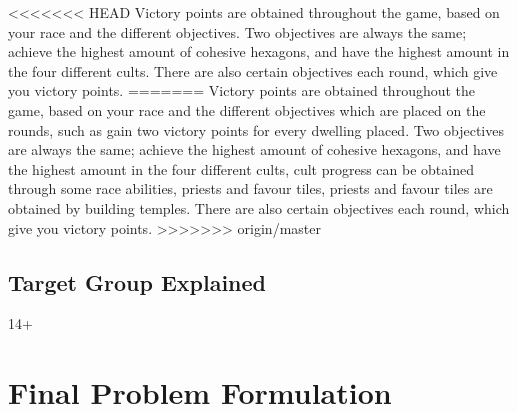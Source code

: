 <<<<<<< HEAD
Victory points are obtained throughout the game, based on your race and the different objectives. Two objectives are always the same; achieve the highest amount of cohesive hexagons, and have the highest amount in the four different cults. There are also certain objectives each round, which give you victory points. 
=======
Victory points are obtained throughout the game, based on your race and the different objectives which are placed on the rounds, such as gain two victory points for every dwelling placed. Two objectives are always the same; achieve the highest amount of cohesive hexagons, and have the highest amount in the four different cults, cult progress can be obtained through some race abilities, priests and favour tiles, priests and favour tiles are obtained by building temples. There are also certain objectives each round, which give you victory points. 
>>>>>>> origin/master

\subsection{Target Group Explained}
14+
\section{Final Problem Formulation}\label{sec:finalprob}


